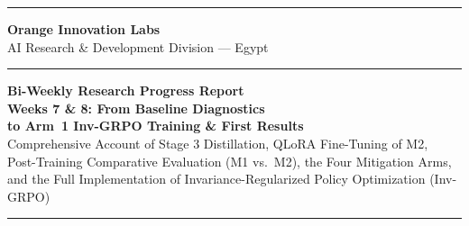 \documentclass[12pt, a4paper]{article}
\begin{document}
\begin{titlepage}
  \pagecolor{DarkBG}
  \color{white}
  \begin{center}
    \vspace*{0.8cm}
    
    {\color{OrangeMain}\rule{\textwidth}{3pt}}
    \vspace{0.4cm}
    
    {\Large\bfseries\color{OrangeLight} Orange Innovation Labs}\\[0.2cm]
    {\normalsize\color{MidGray} AI Research \& Development Division --- Egypt}
    
    \vspace{0.6cm}
    {\color{OrangeMain}\rule{0.4\textwidth}{1pt}}
    \vspace{0.6cm}
    
    {\Huge\bfseries\color{white}
      Bi-Weekly Research Progress Report\\[0.3cm]
      \color{OrangeMain} Weeks 7 \& 8: From Baseline Diagnostics\\
      \color{white} to Arm~1 Inv-GRPO Training \& First Results}\\[0.4cm]
    
    {\large\color{LightGray}
      Comprehensive Account of Stage 3 Distillation, QLoRA Fine-Tuning of M2,\\
      Post-Training Comparative Evaluation (M1 vs.\ M2), the Four Mitigation Arms,\\
      and the Full Implementation of Invariance-Regularized Policy Optimization (Inv-GRPO)}
    
    \vspace{0.8cm}
    {\color{OrangeMain}\rule{0.4\textwidth}{1pt}}
    \vspace{0.8cm}
    

\end{center}
\end{titlepage}
\end{document}
